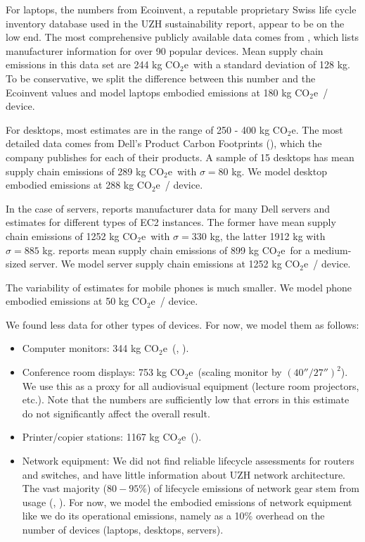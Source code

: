 \documentclass[11pt]{article}
\newcommand{\coe}{CO$_2$e}
\newcommand{\gcoe}{g \coe}
\newcommand{\kgcoe}{k\gcoe}
\begin{document}
For laptops, the numbers from Ecoinvent, a reputable proprietary Swiss life cycle inventory database used in the UZH sustainability report, appear to be on the low end. The most comprehensive publicly available data comes from \textcite{rarecoil}, which lists manufacturer information for over 90 popular devices. Mean supply chain emissions in this data set are 244 \kgcoe\ with a standard deviation of 128 kg. To be conservative, we split the difference between this number and the Ecoinvent values and model laptops embodied emissions at 180 \kgcoe\ / device.

For desktops, most estimates are in the range of 250 - 400 \kgcoe. The most detailed data comes from Dell's Product Carbon Footprints (\cite{dellpcf}), which the company publishes for each of their products. A sample of 15 desktops has mean supply chain emissions of 289 \kgcoe\ with $\sigma = 80$ kg. We model desktop embodied emissions at 288 \kgcoe\ / device.

In the case of servers, \textcite{davy2021} reports manufacturer data for many Dell servers and estimates for different types of EC2 instances. The former have mean supply chain emissions of 1252 \kgcoe\ with $\sigma = 330$ kg, the latter 1912 kg with $\sigma = 885$ kg. \textcite{boavizta:api} reports mean supply chain emissions of 899 \kgcoe\ for a medium-sized server. We model server supply chain emissions at 1252 \kgcoe\ / device.

The variability of estimates for mobile phones is much smaller. We model phone embodied emissions at 50 \kgcoe\ / device.

We found less data for other types of devices. For now, we model them as follows:

\begin{itemize}
  \item Computer monitors: 344 \kgcoe\ (\cite{teehan2013}, \cite{dellpcf}).
  \item Conference room displays: 753 \kgcoe\ (scaling monitor by $(40''/27'')^2$). We use this as a proxy for all audiovisual equipment (lecture room projectors, etc.). Note that the numbers are sufficiently low that errors in this estimate do not significantly affect the overall result.
  \item Printer/copier stations: 1167 \kgcoe\ (\cite{ecoinvent}).
  \item Network equipment: We did not find reliable lifecycle assessments for routers and switches, and have little information about UZH network architecture. The vast majority ($80-95\%$) of lifecycle emissions of network gear stem from usage (\cite{cisco2024}, \cite{jacob2023}). For now, we model the embodied emissions of network equipment like we do its operational emissions, namely as a 10\% overhead on the number of devices (laptops, desktops, servers).
\end{itemize}
\end{document}
